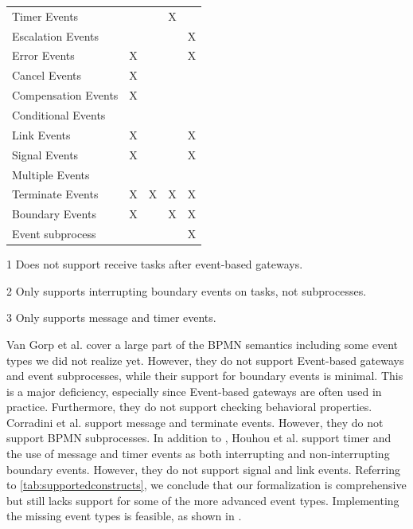 \documentclass[runningheads]{llncs}
\begin{document}
\begin{table}[htbp]
\begin{threeparttable}
\begin{tabular}{l l l l l}
      Timer Events & & & X & \\
      Escalation Events & & & & X\\
      Error Events & X & & & X\\
      Cancel Events & X & & &\\
      Compensation Events & X & & &\\
      Conditional Events & & & &\\
      Link Events & X & & & X\\
      Signal Events & X & & & X\\
      Multiple Events &  & & & \\
      Terminate Events & X & X & X & X\\
     Boundary Events & X\tnote{2} & & X\tnote{3} & X\\ %
      Event subprocess &  &  &  & X\\
    \end{tabular}
    \begin{tablenotes}
        \item[1] Does not support receive tasks after event-based gateways.
        \item[2] Only supports interrupting boundary events on tasks, not subprocesses.
        \item[3] Only supports message and timer events.
    \end{tablenotes}
    \end{threeparttable}
\end{table}

Van Gorp et al. \cite{vangorpVisualTokenbasedFormalization2013} cover a large part of the BPMN semantics including some event types we did not realize yet.
However, they do not support Event-based gateways and event subprocesses, while their support for boundary events is minimal.
This is a major deficiency, especially since Event-based gateways are often used in practice.
Furthermore, they do not support checking behavioral properties.
Corradini et al. \cite{corradiniFormalApproachAnalysis2021} support message and terminate events.
However, they do not support BPMN subprocesses.
In addition to \cite{corradiniFormalApproachAnalysis2021}, Houhou et al. \cite{houhouFirstOrderLogicVerification2022} support timer and the use of message and timer events as both interrupting and non-interrupting boundary events.
However, they do not support signal and link events.
Referring to \autoref{tab:supportedconstructs}, we conclude that our formalization is comprehensive but still lacks support for some of the more advanced event types.
Implementing the missing event types is feasible, as shown in \cite{vangorpVisualTokenbasedFormalization2013}.
\end{document}
